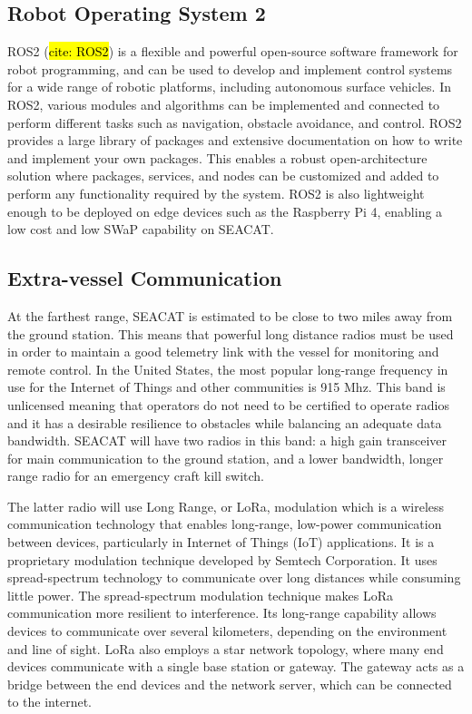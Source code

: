 \subsection{Robot Operating System 2}
ROS2 (\hl{cite: ROS2}) is a flexible and powerful open-source software framework for robot programming, and can be used to develop and implement control systems for a wide range of robotic platforms, including autonomous surface vehicles. 
In ROS2, various modules and algorithms can be implemented and connected to perform different tasks such as navigation, obstacle avoidance, and control. 
ROS2 provides a large library of packages and extensive documentation on how to write and implement your own packages. 
This enables a robust open-architecture solution where packages, services, and nodes can be customized and added to perform any functionality required by the system.
ROS2 is also lightweight enough to be deployed on edge devices such as the Raspberry Pi 4, enabling a low cost and low SWaP capability on SEACAT.

\subsection{Extra-vessel Communication}
At the farthest range, SEACAT is estimated to be close to two miles away from the ground station.
This means that powerful long distance radios must be used in order to maintain a good telemetry link with the vessel for monitoring and remote control.
In the United States, the most popular long-range frequency in use for the Internet of Things and other communities is 915 Mhz.
This band is unlicensed meaning that operators do not need to be certified to operate radios and it has a desirable resilience to obstacles while balancing an adequate data bandwidth.
SEACAT will have two radios in this band: a high gain transceiver for main communication to the ground station, and a lower bandwidth, longer range radio for an emergency craft kill switch.

The latter radio will use Long Range, or LoRa, modulation which is a wireless communication technology that enables long-range, low-power communication between devices, particularly in Internet of Things (IoT) applications. 
It is a proprietary modulation technique developed by Semtech Corporation. 
It uses spread-spectrum technology to communicate over long distances while consuming little power. 
The spread-spectrum modulation technique makes LoRa communication more resilient to interference. 
Its long-range capability allows devices to communicate over several kilometers, depending on the environment and line of sight. 
LoRa also employs a star network topology, where many end devices communicate with a single base station or gateway. 
The gateway acts as a bridge between the end devices and the network server, which can be connected to the internet. 


